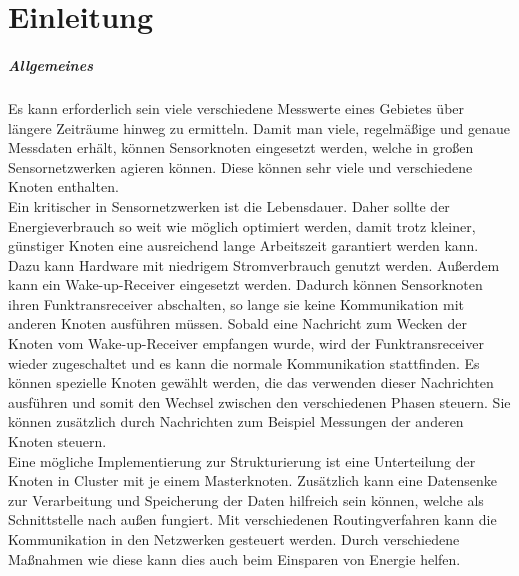 \chapter{Einleitung}

\paragraph{Allgemeines}
Es kann erforderlich sein viele verschiedene Messwerte eines Gebietes über längere Zeiträume hinweg zu ermitteln. Damit man viele, regelmäßige und genaue Messdaten erhält, können Sensorknoten eingesetzt werden, welche in großen Sensornetzwerken agieren können. Diese können sehr viele und verschiedene Knoten enthalten.\\
Ein kritischer in Sensornetzwerken ist die Lebensdauer. Daher sollte der Energieverbrauch so weit wie möglich optimiert werden, damit trotz kleiner, günstiger Knoten eine ausreichend lange Arbeitszeit garantiert werden kann. Dazu kann Hardware mit niedrigem Stromverbrauch genutzt werden. Außerdem kann ein Wake-up-Receiver eingesetzt werden. Dadurch können Sensorknoten ihren Funktransreceiver abschalten, so lange sie keine Kommunikation mit anderen Knoten ausführen müssen. Sobald eine Nachricht zum Wecken der Knoten vom Wake-up-Receiver empfangen wurde, wird der Funktransreceiver wieder zugeschaltet und es kann die normale Kommunikation stattfinden. Es können spezielle Knoten gewählt werden, die das verwenden dieser Nachrichten ausführen und somit den Wechsel zwischen den verschiedenen Phasen steuern. Sie können zusätzlich durch Nachrichten zum Beispiel Messungen der anderen Knoten steuern.\\
Eine mögliche Implementierung zur Strukturierung ist eine Unterteilung der Knoten in Cluster mit je einem Masterknoten. Zusätzlich kann eine Datensenke zur Verarbeitung und Speicherung der Daten hilfreich sein können, welche als Schnittstelle nach außen fungiert. Mit verschiedenen Routingverfahren kann die Kommunikation in den Netzwerken gesteuert werden. Durch verschiedene Maßnahmen wie diese kann dies auch beim Einsparen von Energie helfen.\\
\\

